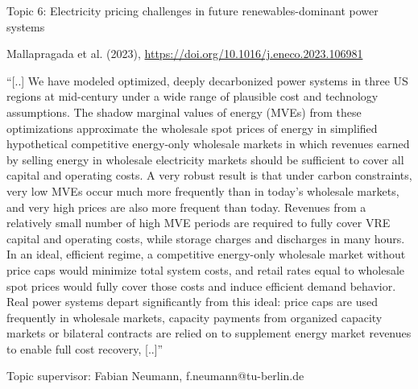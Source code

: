 \documentclass[10pt,aspectratio=169,dvipsnames]{beamer}
\begin{document}
\begin{frame}
  \begin{block}{Topic 6: Electricity pricing challenges in future renewables-dominant power systems}
      
    Mallapragada et al. (2023), \href{https://doi.org/10.1016/j.eneco.2023.106981}{https://doi.org/10.1016/j.eneco.2023.106981}
    
    \enquote{[..] We have modeled optimized, deeply decarbonized power systems in three US regions at mid-century under a wide range of plausible cost and technology assumptions. The shadow marginal values of energy (MVEs) from these optimizations approximate the wholesale spot prices of energy in simplified hypothetical competitive energy-only wholesale markets in which revenues earned by selling energy in wholesale electricity markets should be sufficient to cover all capital and operating costs. A very robust result is that under carbon constraints, very low MVEs occur much more frequently than in today's wholesale markets, and very high prices are also more frequent than today. Revenues from a relatively small number of high MVE periods are required to fully cover VRE capital and operating costs, while storage charges and discharges in many hours. In an ideal, efficient regime, a competitive energy-only wholesale market without price caps would minimize total system costs, and retail rates equal to wholesale spot prices would fully cover those costs and induce efficient demand behavior. Real power systems depart significantly from this ideal: price caps are used frequently in wholesale markets, capacity payments from organized capacity markets or bilateral contracts are relied on to supplement energy market revenues to enable full cost recovery, [..]}

    \hfill
    Topic supervisor: Fabian Neumann, f.neumann@tu-berlin.de
    
  \end{block}
\end{frame}
\end{document}
